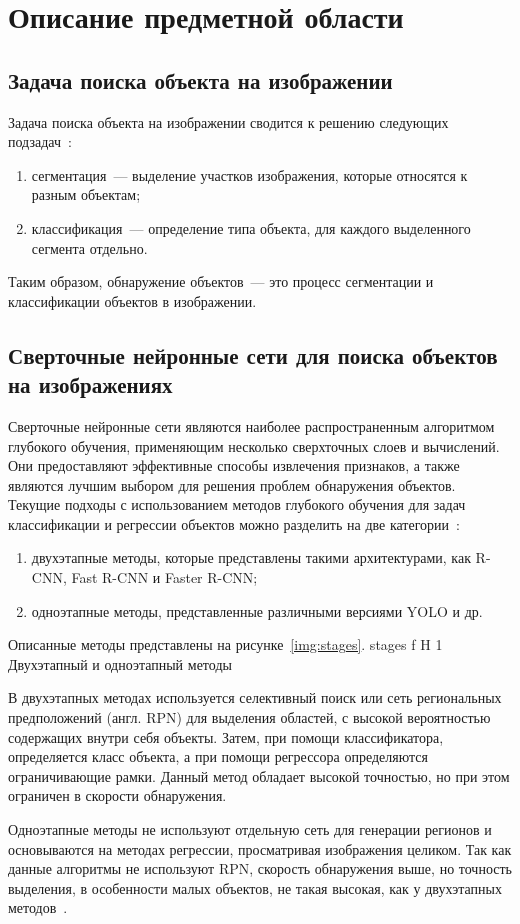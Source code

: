 \chapter{Описание предметной области}

\section{Задача поиска объекта на изображении}

Задача поиска объекта на изображении сводится к решению следующих подзадач~\cite{task}: 
\begin{enumerate}
	\item сегментация~--- выделение участков изображения, которые относятся к разным объектам;
	\item классификация~--- определение типа объекта, для каждого выделенного сегмента отдельно.
\end{enumerate}
Таким образом, обнаружение объектов~--- это процесс сегментации и классификации объектов в изображении. 

\section{Сверточные нейронные сети для поиска объектов на изображениях}

Сверточные нейронные сети являются наиболее распространенным алгоритмом глубокого обучения, применяющим несколько сверхточных слоев и вычислений.
Они предоставляют эффективные способы извлечения признаков, а также являются лучшим выбором для решения проблем обнаружения объектов.
Текущие подходы с использованием методов глубокого обучения для задач классификации и регрессии объектов можно разделить на две категории~\cite{base}:
\begin{enumerate}
	\item двухэтапные методы, которые представлены такими архитектурами, как R-CNN, Fast R-CNN и Faster R-CNN;
	\item одноэтапные методы, представленные различными версиями YOLO и др.
\end{enumerate}

\clearpage
Описанные методы представлены на рисунке~\ref{img:stages}.
	{stages}
	{f}
	{H}
	{1\textwidth}
	{Двухэтапный и одноэтапный методы}

В двухэтапных методах используется селективный поиск или сеть региональных предположений (англ. RPN) для выделения областей, с высокой вероятностью содержащих внутри себя объекты.
Затем, при помощи классификатора, определяется класс объекта, а при помощи регрессора определяются ограничивающие рамки.
Данный метод обладает высокой точностью, но при этом ограничен в скорости обнаружения.

Одноэтапные методы не используют отдельную сеть для генерации регионов и основываются на методах регрессии, просматривая изображения целиком.
Так как данные алгоритмы не используют RPN, скорость обнаружения выше, но точность выделения, в особенности малых объектов, не такая высокая, как у двухэтапных методов~\cite{base}.